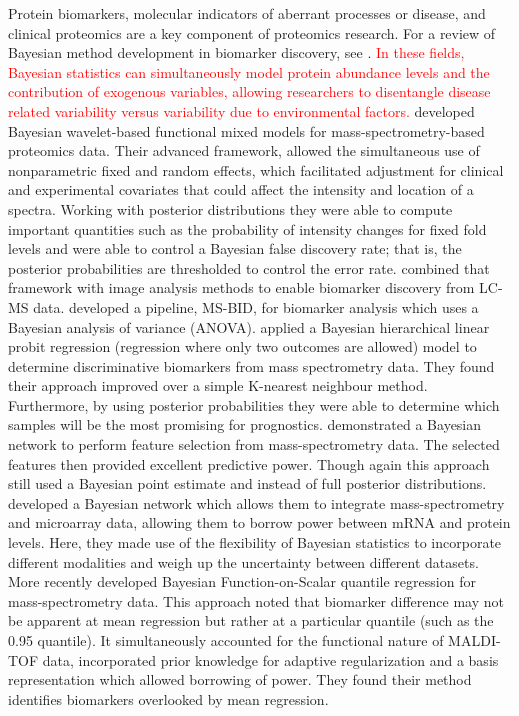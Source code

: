 \documentclass[12pt,english, journal=jpr, layout=twocolumn]{article}
\begin{document}
Protein biomarkers, molecular indicators of aberrant processes or disease, and clinical proteomics are a key component of proteomics research. For a review of Bayesian method development in biomarker discovery, see \citet{Hernandez::2015}. \textcolor{red}{In these fields, Bayesian statistics can simultaneously model protein abundance levels and the contribution of exogenous variables, allowing researchers to disentangle disease related variability versus variability due to environmental factors.} \citet{Morris::2006, Morris::2008} developed Bayesian wavelet-based functional mixed models for mass-spectrometry-based proteomics data. Their advanced framework, allowed the simultaneous use of nonparametric fixed and random effects, which facilitated adjustment for clinical and experimental covariates that could affect the intensity and location of a spectra. Working with posterior distributions they were able to compute important quantities such as the probability of intensity changes for fixed fold levels and were able to control a Bayesian false discovery rate; that is, the posterior probabilities are thresholded to control the error rate. \citet{Liao::2014} combined that framework with image analysis methods to enable biomarker discovery from LC-MS data. \citet{Hwang::2008} developed a pipeline, MS-BID, for biomarker analysis which uses a Bayesian analysis of variance (ANOVA). \citet{Harris::2009} applied a Bayesian hierarchical linear probit regression (regression where only two outcomes are allowed) model to determine discriminative biomarkers from mass spectrometry data. They found their approach improved over a simple K-nearest neighbour method. Furthermore, by using posterior probabilities they were able to determine which samples will be the most promising for prognostics. \citet{Kuschner::2010} demonstrated a Bayesian network to perform feature selection from mass-spectrometry data. The selected features then provided excellent predictive power. Though again this approach still used a Bayesian point estimate and instead of full posterior distributions. \citet{Deng::2007} developed a Bayesian network which allows them to integrate mass-spectrometry and microarray data, allowing them to borrow power between mRNA and protein levels. Here, they made use of the flexibility of Bayesian statistics to incorporate different modalities and weigh up the uncertainty between different datasets. More recently \citet{Liu::2020} developed Bayesian Function-on-Scalar quantile regression for mass-spectrometry data. This approach noted that biomarker difference may not be apparent at mean regression but rather at a particular quantile (such as the 0.95 quantile). It simultaneously accounted for the functional nature of MALDI-TOF data, incorporated prior knowledge for adaptive regularization and a basis representation which allowed borrowing of power. They found their method identifies biomarkers overlooked by mean regression. 
\end{document}
